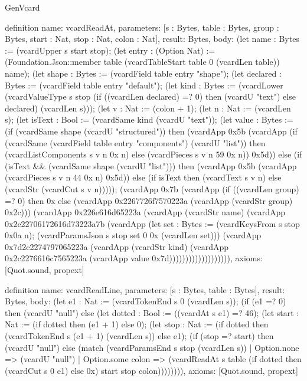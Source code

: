 \begin{lexlean}{GenVcard}
\begin{semanticmodule}
definition{
  name: vcardReadAt,
  parameters: [s : Bytes, table : Bytes, group : Bytes, start : Nat, stop : Nat, colon : Nat],
  result: Bytes,
  body: (let name : Bytes := (vcardUpper s start stop); (let entry : (Option Nat) := (Foundation.Json::member table (vcardTableStart table 0 (vcardLen table)) name); (let shape : Bytes := (vcardField table entry "shape"); (let declared : Bytes := (vcardField table entry "default"); (let kind : Bytes := (vcardLower (vcardValueType s stop (if ((vcardLen declared) =? 0) then (vcardU "text") else declared) (vcardLen s))); (let v : Nat := (colon + 1); (let n : Nat := (vcardLen s); (let isText : Bool := (vcardSame kind (vcardU "text")); (let value : Bytes := (if (vcardSame shape (vcardU "structured")) then (vcardApp 0x5b (vcardApp (if (vcardSame (vcardField table entry "components") (vcardU "list")) then (vcardListComponents s v n 0x n) else (vcardPieces s v n 59 0x n)) 0x5d)) else (if (isText && (vcardSame shape (vcardU "list"))) then (vcardApp 0x5b (vcardApp (vcardPieces s v n 44 0x n) 0x5d)) else (if isText then (vcardText s v n) else (vcardStr (vcardCut s v n))))); (vcardApp 0x7b (vcardApp (if ((vcardLen group) =? 0) then 0x else (vcardApp 0x2267726f7570223a (vcardApp (vcardStr group) 0x2c))) (vcardApp 0x226e616d65223a (vcardApp (vcardStr name) (vcardApp 0x2c22706172616d73223a7b (vcardApp (let set : Bytes := (vcardKeysFrom s stop 0x0a n); (vcardParamsJson s stop set 0 0x (vcardLen set))) (vcardApp 0x7d2c2274797065223a (vcardApp (vcardStr kind) (vcardApp 0x2c2276616c7565223a (vcardApp value 0x7d))))))))))))))))))),
  axioms: [Quot.sound, propext]
}

definition{
  name: vcardReadLine,
  parameters: [s : Bytes, table : Bytes],
  result: Bytes,
  body: (let e1 : Nat := (vcardTokenEnd s 0 (vcardLen s)); (if (e1 =? 0) then (vcardU "null") else (let dotted : Bool := ((vcardAt s e1) =? 46); (let start : Nat := (if dotted then (e1 + 1) else 0); (let stop : Nat := (if dotted then (vcardTokenEnd s (e1 + 1) (vcardLen s)) else e1); (if (stop =? start) then (vcardU "null") else (match (vcardParamsEnd s stop (vcardLen s))
    | Option.none => (vcardU "null")
    | Option.some colon => (vcardReadAt s table (if dotted then (vcardCut s 0 e1) else 0x) start stop colon)))))))),
  axioms: [Quot.sound, propext]
}


\end{semanticmodule}
\end{lexlean}
